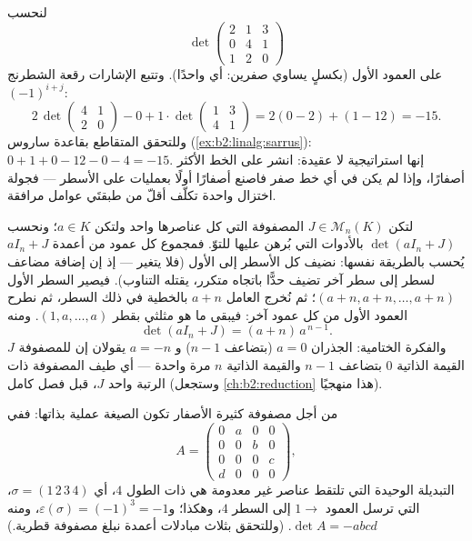 \begin{example}\label{ex:b2:linalg:cofactorwork}
لنحسب
\[
\det\begin{pmatrix}
2 & 1 & 3\\
0 & 4 & 1\\
1 & 2 & 0
\end{pmatrix}
\]
على العمود الأول (بكسلٍ يساوي صفرين: أي واحدًا).
وتتبع الإشارات رقعة الشطرنج $(-1)^{i+j}$:
\[
2\,\det\begin{pmatrix}4 & 1\\ 2 & 0\end{pmatrix}
- 0
+ 1\cdot\det\begin{pmatrix}1 & 3\\ 4 & 1\end{pmatrix}
= 2(0 - 2) + (1 - 12) = -15 .
\]
وللتحقق المتقاطع بقاعدة ساروس (\cref{ex:b2:linalg:sarrus}): $0 + 1 + 0
- 12 - 0 - 4 = -15$. إنها استراتيجية لا عقيدة: انشر على
الخط الأكثر أصفارًا، وإذا لم يكن في أي خط صفر فاصنع
أصفارًا أولًا بعمليات على الأسطر --- فجولة اختزال واحدة تكلّف
أقلّ من طبقتَي عوامل مرافقة.
\end{example}

\begin{example}\label{ex:b2:linalg:onesmatrix}
لتكن $J \in \mathcal{M}_n(K)$ المصفوفة التي كل عناصرها واحد ولتكن $a \in K$؛
ونحسب $\det(aI_n + J)$ بالأدوات التي بُرهن عليها للتوّ. فمجموع كل
عمود من أعمدة $aI_n + J$ يُحسب بالطريقة نفسها: نضيف كل الأسطر إلى
الأول (فلا يتغير  --- إذ إن إضافة مضاعف لسطر إلى
سطر آخر تضيف حدًّا باتجاه متكرر، يقتله التناوب).
فيصير السطر الأول $(a + n, a + n, \dots, a + n)$؛ ثم نُخرج العامل
$a + n$ بالخطية في ذلك السطر، ثم نطرح العمود الأول
من كل عمود آخر: فيبقى ما هو مثلثي بقطر
$(1, a, \dots, a)$. ومنه
\[
\det(aI_n + J) = (a + n)\,a^{\,n-1}.
\]
والفكرة الختامية: الجذران $a = 0$ (بتضاعف $n - 1$) و
$a = -n$ يقولان إن للمصفوفة $J$ القيمة الذاتية $0$ بتضاعف $n - 1$
والقيمة الذاتية $n$ مرة واحدة --- أي طيف المصفوفة ذات الرتبة واحد
$J$، قبل فصل كامل (وستجعل \cref{ch:b2:reduction} هذا
منهجيًا).
\end{example}

\begin{example}\label{ex:b2:linalg:permexample}
من أجل مصفوفة كثيرة الأصفار تكون الصيغة عملية بذاتها:
ففي
\[
A = \begin{pmatrix}
0 & a & 0 & 0\\
0 & 0 & b & 0\\
0 & 0 & 0 & c\\
d & 0 & 0 & 0
\end{pmatrix},
\]
التبديلة الوحيدة التي تلتقط عناصر غير معدومة هي  ذات الطول $4$،
أي $\sigma = (1\,2\,3\,4)$، التي ترسل العمود $1 \to$ إلى السطر $4$، وهكذا؛
و$\varepsilon(\sigma) = (-1)^3 = -1$، ومنه $\det A = -abcd$. (وللتحقق
بثلاث مبادلات أعمدة نبلغ مصفوفة قطرية.)
\end{example}

